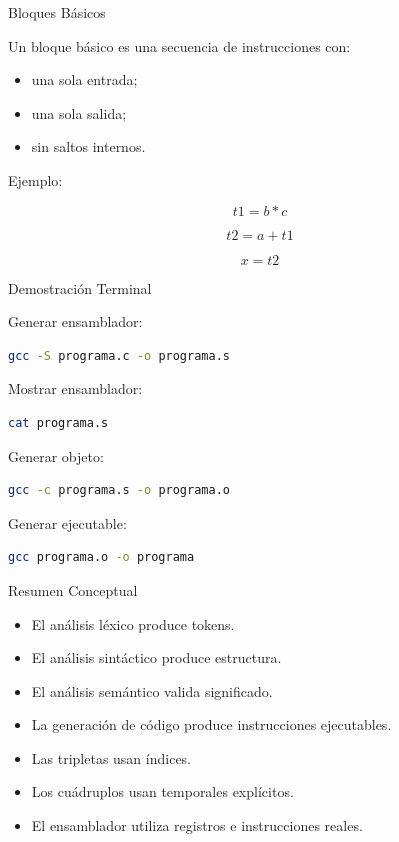 \documentclass{beamer}
\begin{document}
\begin{frame}{Bloques Básicos}

Un bloque básico es una secuencia de instrucciones con:

\begin{itemize}
    \item una sola entrada;
    \item una sola salida;
    \item sin saltos internos.
\end{itemize}

\vspace{0.4cm}

Ejemplo:

\[
t1 = b * c
\]

\[
t2 = a + t1
\]

\[
x = t2
\]

\end{frame}


\begin{frame}[fragile]{Demostración Terminal}

Generar ensamblador:

\begin{lstlisting}[language=bash]
gcc -S programa.c -o programa.s
\end{lstlisting}

Mostrar ensamblador:

\begin{lstlisting}[language=bash]
cat programa.s
\end{lstlisting}

Generar objeto:

\begin{lstlisting}[language=bash]
gcc -c programa.s -o programa.o
\end{lstlisting}

Generar ejecutable:

\begin{lstlisting}[language=bash]
gcc programa.o -o programa
\end{lstlisting}

\end{frame}

\begin{frame}{Resumen Conceptual}

\begin{itemize}
    \item El análisis léxico produce tokens.
    \item El análisis sintáctico produce estructura.
    \item El análisis semántico valida significado.
    \item La generación de código produce instrucciones ejecutables.
    \item Las tripletas usan índices.
    \item Los cuádruplos usan temporales explícitos.
    \item El ensamblador utiliza registros e instrucciones reales.
\end{itemize}

\end{frame}
\end{document}

